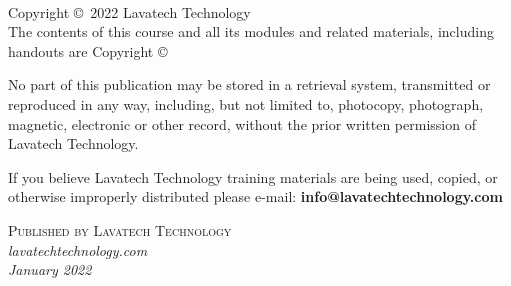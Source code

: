 \documentclass[14pt,fleqn]{extbook} %
\begin{document}

\begingroup
\thispagestyle{empty} %
\vfill
\endgroup


\newpage

~\vfill
\thispagestyle{empty}

\noindent Copyright \copyright\ 2022 Lavatech Technology\\ %

The contents of this course and all its modules and related materials, including handouts are
Copyright ©

No part of this publication may be stored in a retrieval system, transmitted or reproduced in any way, including, but not limited to, photocopy, photograph, magnetic, electronic or other record, without the prior written permission of Lavatech Technology.

If you believe Lavatech Technology training materials are being used, copied, or otherwise improperly distributed please e-mail: 
\newline
\textbf{info@lavatechtechnology.com}

\noindent \textsc{Published by Lavatech Technology}\\ %

\noindent \textit{lavatechtechnology.com}\\ %

%
\noindent \textit{January 2022} %
\end{document}
